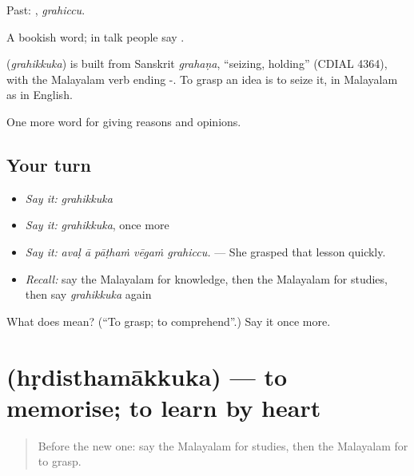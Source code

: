 Past: , \emph{grahiccu}.

A bookish word; in talk people say .

\begin{cousinweb}
\textbf{} (\emph{grahikkuka}) is built from Sanskrit \emph{grahaṇa}, \textquotedblleft{}seizing, holding\textquotedblright{} (CDIAL 4364), with the Malayalam verb ending -. To grasp an idea is to seize it, in Malayalam as in English.
\end{cousinweb}

\begin{grammarlens}[title={What you've built}]
One more word for giving reasons and opinions.
\end{grammarlens}

\subsection*{Your turn}
\begin{itemize}
\raggedright
  \item \emph{Say it:} \emph{grahikkuka}
  \item \emph{Say it:} \emph{grahikkuka}, once more
  \item \emph{Say it:} \emph{avaḷ ā pāṭhaṁ vēgaṁ grahiccu.} — She grasped that lesson quickly.
  \item \emph{Recall:} say the Malayalam for knowledge, then the Malayalam for studies, then say \emph{grahikkuka} again
\end{itemize}

\begin{tcolorbox}[breakable,colback=teal!4,colframe=teal!35!black,title={Before you move on}]
What does  mean? (\textquotedblleft{}To grasp; to comprehend\textquotedblright{}.) Say it once more.
\end{tcolorbox}
\section[\texorpdfstring{\ml{ഹൃദിസ്ഥമാക്കുക} (hṛdisthamākkuka)}{ഹൃദിസ്ഥമാക്കുക (hṛdisthamākkuka)}]{ (hṛdisthamākkuka) — to memorise; to learn by heart}

\label{lesson:ML-C438-hrdisthamakkuka}



\begin{quote}
Before the new one: say the Malayalam for studies, then the Malayalam for to grasp.
\end{quote}


